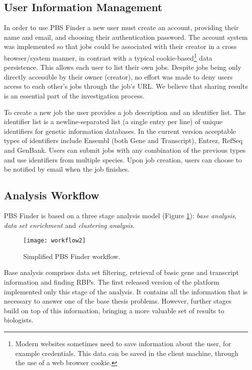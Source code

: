 \subsection{User Information Management}

In order to use PBS Finder a new user must create an account, providing their
name and email, and choosing their authentication password. The account system
was implemented so that jobs could be associated with their creator in a cross
browser/system manner, in contrast with a typical cookie-based\footnote{Modern
websites sometimes need to save information about the user, for example
credentials. This data can be saved in the client machine, through the use of a
web browser cookie.} data persistence. This allows each user to list their own
jobs. Despite jobs being only directly accessible by their owner (creator), no
effort was made to deny users access to each other's jobs through the job's URL.
We believe that sharing results is an essential part of the investigation
process.

To create a new job the user provides a job description and an identifier list.
The identifier list is a newline-separated list (a single entry per line) of
unique identifiers for genetic information databases. In the current version
acceptable types of identifiers include Ensembl (both Gene and Transcript),
Entrez, RefSeq and GenBank. Users can submit jobs with any combination of the
previous types and use identifiers from multiple species. Upon job creation,
users can choose to be notified by email when the job finishes.

\subsection{Analysis Workflow}\label{sec:pbsworkflow}

PBS Finder is based on a three stage analysis model (Figure
\ref{fig:workflow2}): \emph{base analysis}, \emph{data set enrichment} and
\emph{clustering analysis}.

\begin{figure}[!htb]
  \begin{center}
    \leavevmode
    \texttt{[image: workflow2]}
    \caption[Simplified PBS Finder workflow]{
      Simplified PBS Finder workflow.
    }
    \label{fig:workflow2}
  \end{center}
\end{figure}

Base analysis comprises data set filtering, retrieval of basic gene and
transcript information and finding RBPs. The first released version of the
platform implemented only this stage of the analysis. It contains all the
information that is necessary to answer one of the base thesis problems.
However, further stages build on top of this information, bringing a more
valuable set of results to biologists.

